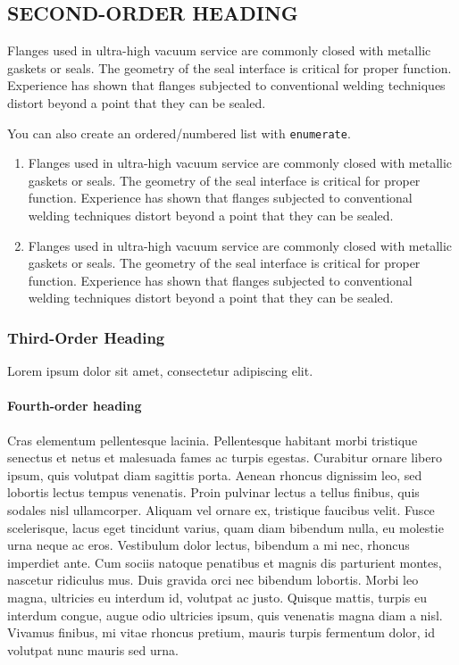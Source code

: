 \documentclass[tm]{ornltm} %
\begin{document}
\subsection{SECOND-ORDER HEADING}

Flanges used in ultra-high vacuum service are commonly closed with metallic
gaskets or seals. The geometry of the seal interface is critical for proper
function. Experience has shown that flanges subjected to conventional welding
techniques distort beyond a point that they can be sealed.

You can also create an ordered/numbered list with \verb|enumerate|.

\begin{enumerate}
  \item Flanges used in ultra-high vacuum service are commonly closed with
    metallic gaskets or seals. The geometry of the seal interface is critical
    for proper function. Experience has shown that flanges subjected to
    conventional welding techniques distort beyond a point that they can be
    sealed.
  \item Flanges used in ultra-high vacuum service are commonly closed with
    metallic gaskets or seals. The geometry of the seal interface is critical
    for proper function. Experience has shown that flanges subjected to
    conventional welding techniques distort beyond a point that they can be
    sealed.
\end{enumerate}

\subsubsection{Third-Order Heading}

Lorem ipsum dolor sit amet, consectetur adipiscing elit.

\paragraph{Fourth-order heading}

Cras elementum pellentesque lacinia. Pellentesque habitant morbi tristique
senectus et netus et malesuada fames ac turpis egestas. Curabitur ornare libero
ipsum, quis volutpat diam sagittis porta. Aenean rhoncus dignissim leo, sed
lobortis lectus tempus venenatis. Proin pulvinar lectus a tellus finibus, quis
sodales nisl ullamcorper. Aliquam vel ornare ex, tristique faucibus velit. Fusce
scelerisque, lacus eget tincidunt varius, quam diam bibendum nulla, eu molestie
urna neque ac eros. Vestibulum dolor lectus, bibendum a mi nec, rhoncus
imperdiet ante. Cum sociis natoque penatibus et magnis dis parturient montes,
nascetur ridiculus mus. Duis gravida orci nec bibendum lobortis. Morbi leo
magna, ultricies eu interdum id, volutpat ac justo. Quisque mattis, turpis eu
interdum congue, augue odio ultricies ipsum, quis venenatis magna diam a nisl.
Vivamus finibus, mi vitae rhoncus pretium, mauris turpis fermentum dolor, id
volutpat nunc mauris sed urna.
\end{document}
